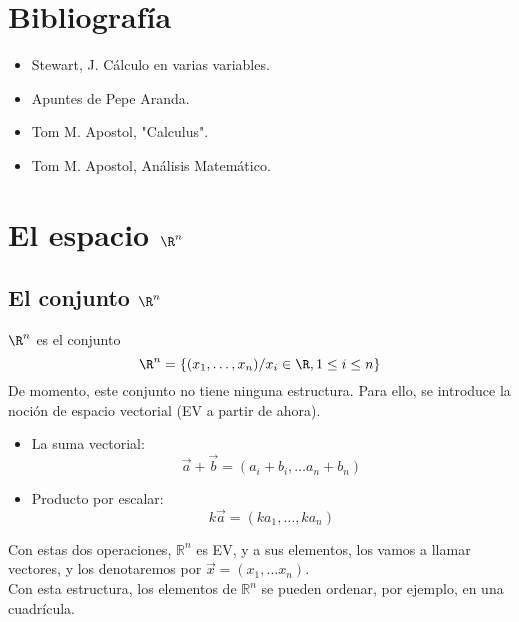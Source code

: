 \documentclass{../Calculo.tex}
\begin{document}
\section{Bibliografía}
\begin{itemize}
	\item Stewart, J. Cálculo en varias variables.
	\item Apuntes de Pepe Aranda.
	\item Tom M. Apostol, "Calculus".
	\item Tom M. Apostol, Análisis Matemático.
\end{itemize}
\pagebreak
\section{El espacio $\R^{n}$}
\subsection{El conjunto $\R^{n}$}
$\R^{n}$ es el conjunto
\[
		\R^{n} =\{ ( x_1,\dots ,x_{n}) / x_{i} \in \R, 1 \leq i \leq n\}
\]
De momento, este conjunto no tiene ninguna estructura. Para ello, se introduce
la noción de espacio vectorial (EV a partir de ahora).
\begin{itemize}
	\item La suma vectorial:
	\[
		\vec{a} + \vec{b} = (a_{i}+b_{i},\dots a_{n}+b_{n})	
	\]
	\item Producto por escalar:
		\[
			k \vec{a} = (ka_{1},\dots ,ka_{n})
		\]
\end{itemize}
Con estas dos operaciones, $\mathbb{R}^{n}$ es EV, y a sus elementos, los vamos a
llamar vectores, y los denotaremos por $\vec{x}=(x_{1},\dots x_{n})$.\\
Con esta estructura, los elementos de $\mathbb{R}^{n}$ se pueden ordenar, por
ejemplo, en una cuadrícula.
\begin{center}


\end{center}
\end{document}
